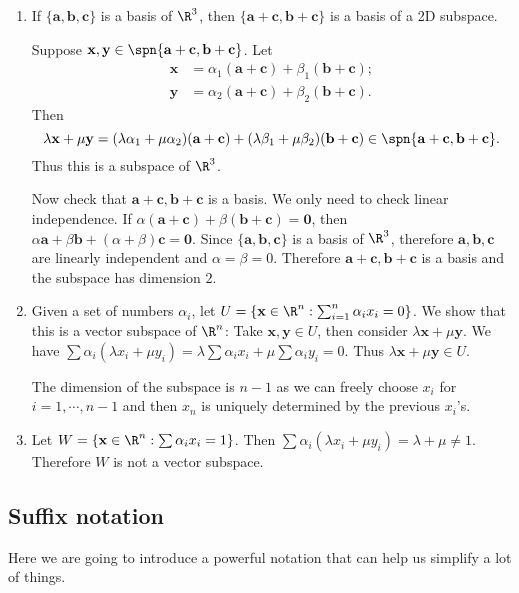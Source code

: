 \documentclass[a4paper]{article}
\begin{document}
\begin{eg}\leavevmode
  \begin{enumerate}
    \item If $\{\mathbf{a, b, c}\}$ is a basis of $\R^3$, then $\{\mathbf{a + c, b + c}\}$ is a basis of a 2D subspace.

      Suppose $\mathbf{x, y}\in \spn\{\mathbf{a + c, b + c}\}$. Let
      \begin{align*}
        \mathbf{x} &= \alpha_1(\mathbf{a + c}) + \beta_1(\mathbf{b + c});\\
        \mathbf{y} &= \alpha_2(\mathbf{a + c}) + \beta_2(\mathbf{b + c}).
      \end{align*}
      Then
      \[
        \lambda\mathbf{x} + \mu\mathbf{y} = (\lambda\alpha_1+\mu\alpha_2)(\mathbf{a + c}) + (\lambda\beta_1 + \mu\beta_2)\mathbf{(b + c)}\in\spn\{\mathbf{a + c, b + c}\}.
      \]
      Thus this is a subspace of $\R^3$.

      Now check that $\mathbf{a + c, b + c}$ is a basis. We only need to check linear independence. If $\alpha(\mathbf{a + c}) + \beta(\mathbf{b + c}) = \mathbf{0}$, then $\alpha\mathbf{a} + \beta\mathbf{b} + (\alpha + \beta)\mathbf{c} = \mathbf{0}$. Since $\{\mathbf{a, b, c}\}$ is a basis of $\R^3$, therefore $\mathbf{a, b, c}$ are linearly independent and $\alpha = \beta = 0$. Therefore $\mathbf{a + c, b + c}$ is a basis and the subspace has dimension $2$.
    \item Given a set of numbers $\alpha_i$, let $U = \{\mathbf{x}\in \R^n: \sum_{i=1}^n \alpha_ix_i = 0\}$. We show that this is a vector subspace of $\R^n$: Take $\mathbf{x, y}\in U$, then consider $\lambda\mathbf{x} + \mu\mathbf{y}$. We have $\sum\alpha_i(\lambda x_i + \mu y_i) = \lambda\sum\alpha_ix_i + \mu\sum\alpha_iy_i = 0$. Thus $\lambda\mathbf{x} + \mu\mathbf{y} \in U$.

      The dimension of the subspace is $n-1$ as we can freely choose $x_i$ for $i = 1, \cdots, n - 1$ and then $x_n$ is uniquely determined by the previous $x_i$'s.
    \item Let $W = \{\mathbf{x}\in \R^n: \sum \alpha_ix_i = 1\}$. Then $\sum\alpha_i(\lambda x_i + \mu y_i) = \lambda + \mu \not= 1$. Therefore $W$ is not a vector subspace.
  \end{enumerate}
\end{eg}

\subsection{Suffix notation}
Here we are going to introduce a powerful notation that can help us simplify a lot of things.
\end{document}
